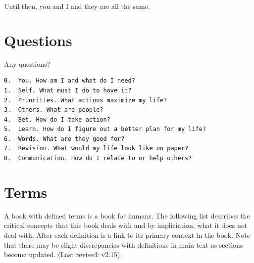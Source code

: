 \documentclass[
]{book}
\begin{document}
Until then, you and I and they are all the same.

\hypertarget{questions}{%
\section{Questions}\label{questions}}

Any questions?

\begin{verbatim}
0.  You. How am I and what do I need?
1.  Self. What must I do to have it?
2.  Priorities. What actions maximize my life?
3.  Others. What are people?
4.  Bet. How do I take action?
5.  Learn. How do I figure out a better plan for my life?
6.  Words. What are they good for?
7.  Revision. What would my life look like on paper?
8.  Communication. How do I relate to or help others?  
\end{verbatim}

\hypertarget{terms}{%
\section{Terms}\label{terms}}

A book with defined terms is a book for humans.
The following list describes the critical concepts that this book deals with and by impliciation, what it does not deal with.
After each definition is a link to its primary context in the book.
Note that there may be slight discrepancies with definitions in main text as sections become updated. (Last revised: v2.15).
\end{document}
